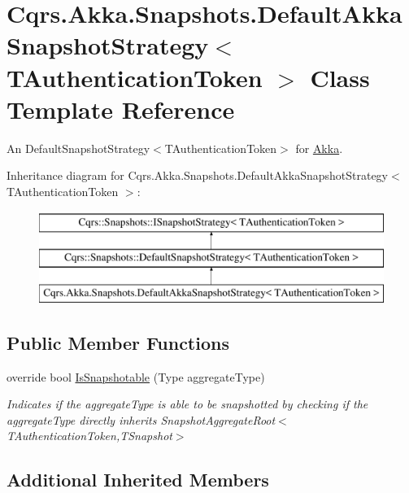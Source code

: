\hypertarget{classCqrs_1_1Akka_1_1Snapshots_1_1DefaultAkkaSnapshotStrategy}{}\section{Cqrs.\+Akka.\+Snapshots.\+Default\+Akka\+Snapshot\+Strategy$<$ T\+Authentication\+Token $>$ Class Template Reference}
\label{classCqrs_1_1Akka_1_1Snapshots_1_1DefaultAkkaSnapshotStrategy}


An Default\+Snapshot\+Strategy$<$\+T\+Authentication\+Token$>$ for \hyperlink{namespaceCqrs_1_1Akka}{Akka}.  


Inheritance diagram for Cqrs.\+Akka.\+Snapshots.\+Default\+Akka\+Snapshot\+Strategy$<$ T\+Authentication\+Token $>$\+:\begin{figure}[H]
\begin{center}
\leavevmode
\includegraphics[height=3.000000cm]{classCqrs_1_1Akka_1_1Snapshots_1_1DefaultAkkaSnapshotStrategy}
\end{center}
\end{figure}
\subsection*{Public Member Functions}
\begin{DoxyCompactItemize}
\item 
override bool \hyperlink{classCqrs_1_1Akka_1_1Snapshots_1_1DefaultAkkaSnapshotStrategy_ad7d9bb43fc53cf16a242510612f4c13e_ad7d9bb43fc53cf16a242510612f4c13e}{Is\+Snapshotable} (Type aggregate\+Type)
\begin{DoxyCompactList}\small\item\em Indicates if the {\itshape aggregate\+Type}  is able to be snapshotted by checking if the {\itshape aggregate\+Type}  directly inherits Snapshot\+Aggregate\+Root$<$\+T\+Authentication\+Token,\+T\+Snapshot$>$ \end{DoxyCompactList}\end{DoxyCompactItemize}
\subsection*{Additional Inherited Members}


